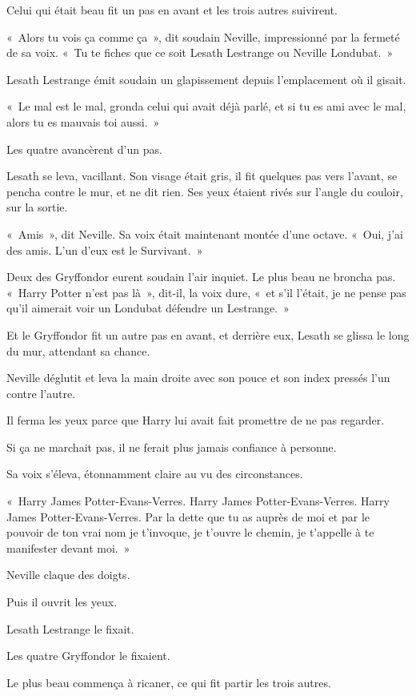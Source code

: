 Celui qui était beau fit un pas en avant et les trois autres suivirent.

«~Alors tu vois ça comme ça~», dit soudain Neville, impressionné par la fermeté de sa voix. «~Tu te fiches que ce soit Lesath Lestrange ou Neville Londubat.~»

Lesath Lestrange émit soudain un glapissement depuis l'emplacement où il gisait.

«~Le mal est le mal, gronda celui qui avait déjà parlé, et si tu es ami avec le mal, alors tu es mauvais toi aussi.~»

Les quatre avancèrent d'un pas.

Lesath se leva, vacillant. Son visage était gris, il fit quelques pas vers l'avant, se pencha contre le mur, et ne dit rien. Ses yeux étaient rivés sur l'angle du couloir, sur la sortie.

«~Amis~», dit Neville. Sa voix était maintenant montée d'une octave. «~Oui, j'ai des amis. L'un d'eux est le Survivant.~»

Deux des Gryffondor eurent soudain l'air inquiet. Le plus beau ne broncha pas. «~Harry Potter n'est pas là~», dit-il, la voix dure, «~et s'il l'était, je ne pense pas qu'il aimerait voir un Londubat défendre un Lestrange.~»

Et le Gryffondor fit un autre pas en avant, et derrière eux, Lesath se glissa le long du mur, attendant sa chance.

Neville déglutit et leva la main droite avec son pouce et son index pressés l'un contre l'autre.

Il ferma les yeux parce que Harry lui avait fait promettre de ne pas regarder.

Si ça ne marchait pas, il ne ferait plus jamais confiance à personne.

Sa voix s'éleva, étonnamment claire au vu des circonstances.

«~Harry James Potter-Evans-Verres. Harry James Potter-Evans-Verres. Harry James Potter-Evans-Verres. Par la dette que tu as auprès de moi et par le pouvoir de ton vrai nom je t'invoque, je t'ouvre le chemin, je t'appelle à te manifester devant moi.~»

Neville claque des doigts.

Puis il ouvrit les yeux.

Lesath Lestrange le fixait.

Les quatre Gryffondor le fixaient.

Le plus beau commença à ricaner, ce qui fit partir les trois autres.

